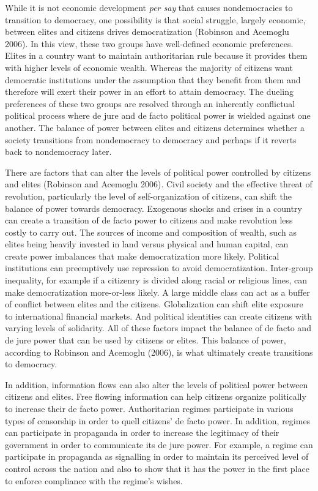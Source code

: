 \documentclass[12pt,]{article}
\begin{document}
While it is not economic development \emph{per say} that causes
nondemocracies to transition to democracy, one possibility is that
social struggle, largely economic, between elites and citizens drives
democratization (Robinson and Acemoglu 2006). In this view, these two
groups have well-defined economic preferences. Elites in a country want
to maintain authoritarian rule because it provides them with higher
levels of economic wealth. Whereas the majority of citizens want
democratic institutions under the assumption that they benefit from them
and therefore will exert their power in an effort to attain democracy.
The dueling preferences of these two groups are resolved through an
inherently conflictual political process where de jure and de facto
political power is wielded against one another. The balance of power
between elites and citizens determines whether a society transitions
from nondemocracy to democracy and perhaps if it reverts back to
nondemocracy later.

There are factors that can alter the levels of political power
controlled by citizens and elites (Robinson and Acemoglu 2006). Civil
society and the effective threat of revolution, particularly the level
of self-organization of citizens, can shift the balance of power towards
democracy. Exogenous shocks and crises in a country can create a
transition of de facto power to citizens and make revolution less costly
to carry out. The sources of income and composition of wealth, such as
elites being heavily invested in land versus physical and human capital,
can create power imbalances that make democratization more likely.
Political institutions can preemptively use repression to avoid
democratization. Inter-group inequality, for example if a citizenry is
divided along racial or religious lines, can make democratization
more-or-less likely. A large middle class can act as a buffer of
conflict between elites and the citizens. Globalization can shift elite
exposure to international financial markets. And political identities
can create citizens with varying levels of solidarity. All of these
factors impact the balance of de facto and de jure power that can be
used by citizens or elites. This balance of power, according to Robinson
and Acemoglu (2006), is what ultimately create transitions to democracy.

In addition, information flows can also alter the levels of political
power between citizens and elites. Free flowing information can help
citizens organize politically to increase their de facto power.
Authoritarian regimes participate in various types of censorship in
order to quell citizens' de facto power. In addition, regimes can
participate in propaganda in order to increase the legitimacy of their
government in order to communicate its de jure power. For example, a
regime can participate in propaganda as signalling in order to maintain
its perceived level of control across the nation and also to show that
it has the power in the first place to enforce compliance with the
regime's wishes.
\end{document}
